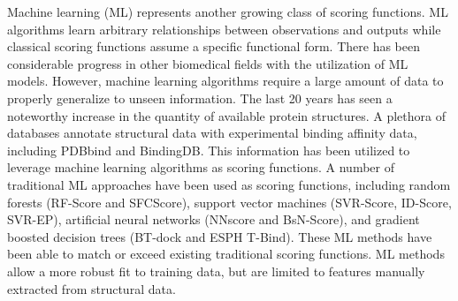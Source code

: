 \documentclass[journal=jcisd8,manuscript=article]{achemso}
\begin{document}
Machine learning (ML) represents another growing class of scoring functions\cite{liu2015classification}. ML algorithms learn arbitrary relationships between observations and outputs while classical scoring functions assume a specific functional form\cite{ain2015machine}. There has been considerable progress in other biomedical fields with the utilization of ML models\cite{zitnik2019machine}. However, machine learning algorithms require a large amount of data to properly generalize to unseen information. The last 20 years has seen a noteworthy increase in the quantity of available protein structures\cite{berman2000protein}. A plethora of databases annotate structural data with experimental binding affinity data, including PDBbind and BindingDB\cite{wang2004pdbbind,liu2017forging,gilson2016bindingdb}. This information has been utilized to leverage machine learning algorithms as scoring functions. A number of traditional ML approaches have been used as scoring functions, including random forests (RF-Score\cite{ballester2010machine} and SFCScore\cite{zilian2013sfcscore}), support vector machines (SVR-Score\cite{ballester2012machine}, ID-Score\cite{li2013idscore}, SVR-EP\cite{li2011svr}), artificial neural networks (NNscore\cite{durrant2010nnscore} and BsN-Score\cite{ashtawy2015bsn}), and gradient boosted decision trees (BT-dock\cite{btdock} and ESPH T-Bind\cite{cang2018integration}). These ML methods have been able to match or exceed existing traditional scoring functions. ML methods allow a more robust fit to training data, but are limited to features manually extracted from structural data.
\end{document}
